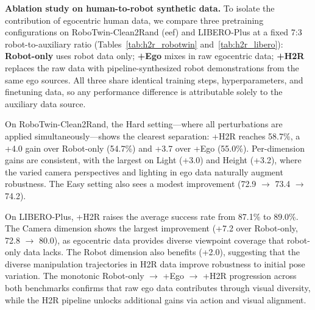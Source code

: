 
\textbf{Ablation study on human-to-robot synthetic data.}
To isolate the contribution of egocentric human data, we compare three pretraining configurations on RoboTwin-Clean2Rand (eef) and LIBERO-Plus at a fixed 7:3 robot-to-auxiliary ratio (Tables~\ref{tab:h2r_robotwin} and~\ref{tab:h2r_libero}): \textbf{Robot-only} uses robot data only; \textbf{+Ego} mixes in raw egocentric data; \textbf{+H2R} replaces the raw data with pipeline-synthesized robot demonstrations from the same ego sources. 
All three share identical training steps, hyperparameters, and finetuning data, so any performance difference is attributable solely to the auxiliary data source.

On RoboTwin-Clean2Rand, the Hard setting---where all perturbations are applied simultaneously---shows the clearest separation: +H2R reaches 58.7\%, a +4.0 gain over Robot-only (54.7\%) and +3.7 over +Ego (55.0\%). 
Per-dimension gains are consistent, with the largest on Light (+3.0) and Height (+3.2), where the varied camera perspectives and lighting in ego data naturally augment robustness. 
The Easy setting also sees a modest improvement (72.9 $\to$ 73.4 $\to$ 74.2).

On LIBERO-Plus, +H2R raises the average success rate from 87.1\% to 89.0\%. 
The Camera dimension shows the largest improvement (+7.2 over Robot-only, 72.8 $\to$ 80.0), as egocentric data provides diverse viewpoint coverage that robot-only data lacks. 
The Robot dimension also benefits (+2.0), suggesting that the diverse manipulation trajectories in H2R data improve robustness to initial pose variation.
The monotonic Robot-only $\to$ +Ego $\to$ +H2R progression across both benchmarks confirms that raw ego data contributes through visual diversity, while the H2R pipeline unlocks additional gains via action and visual alignment.

